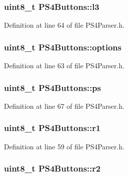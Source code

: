 \hypertarget{union_p_s4_buttons_ab8835f04d0c0c5e630d685ec2fd54e80}{
\subsubsection[{l3}]{\setlength{\rightskip}{0pt plus 5cm}uint8\-\_\-t {\bf \-P\-S4\-Buttons\-::l3}}}\label{union_p_s4_buttons_ab8835f04d0c0c5e630d685ec2fd54e80}


\-Definition at line 64 of file \-P\-S4\-Parser.\-h.

\hypertarget{union_p_s4_buttons_a27f1b87f473ace3a4465ae999858357b}{
\subsubsection[{options}]{\setlength{\rightskip}{0pt plus 5cm}uint8\-\_\-t {\bf \-P\-S4\-Buttons\-::options}}}\label{union_p_s4_buttons_a27f1b87f473ace3a4465ae999858357b}


\-Definition at line 63 of file \-P\-S4\-Parser.\-h.

\hypertarget{union_p_s4_buttons_a5fdf37790214db1379457bab99adace9}{
\subsubsection[{ps}]{\setlength{\rightskip}{0pt plus 5cm}uint8\-\_\-t {\bf \-P\-S4\-Buttons\-::ps}}}\label{union_p_s4_buttons_a5fdf37790214db1379457bab99adace9}


\-Definition at line 67 of file \-P\-S4\-Parser.\-h.

\hypertarget{union_p_s4_buttons_aba0cb76ee82bd0ebe9872aa7bcbffac6}{
\subsubsection[{r1}]{\setlength{\rightskip}{0pt plus 5cm}uint8\-\_\-t {\bf \-P\-S4\-Buttons\-::r1}}}\label{union_p_s4_buttons_aba0cb76ee82bd0ebe9872aa7bcbffac6}


\-Definition at line 59 of file \-P\-S4\-Parser.\-h.

\hypertarget{union_p_s4_buttons_a416642ff357b1313825fe94e0491b60e}{
\subsubsection[{r2}]{\setlength{\rightskip}{0pt plus 5cm}uint8\-\_\-t {\bf \-P\-S4\-Buttons\-::r2}}}\label{union_p_s4_buttons_a416642ff357b1313825fe94e0491b60e}


